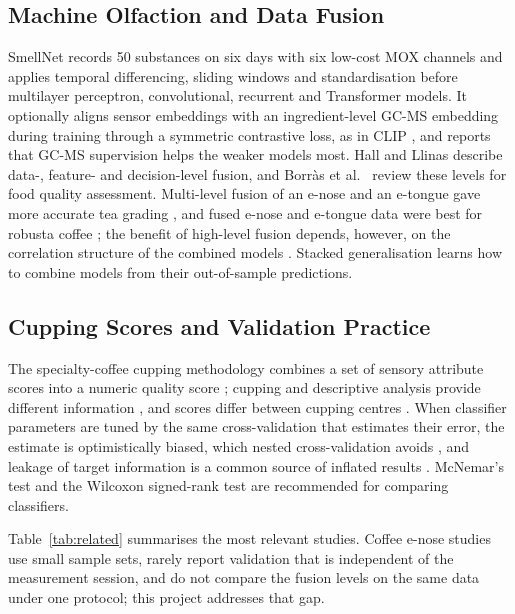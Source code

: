 \documentclass[12pt]{article}
\begin{document}
\subsection{Machine Olfaction and Data Fusion}

SmellNet \cite{feng2026smellnet} records 50 substances on six days with six low-cost MOX channels and applies temporal differencing, sliding windows and standardisation before multilayer perceptron, convolutional, recurrent and Transformer models. It optionally aligns sensor embeddings with an ingredient-level GC-MS embedding during training through a symmetric contrastive loss, as in CLIP \cite{radford2021learning}, and reports that GC-MS supervision helps the weaker models most. Hall and Llinas \cite{hall1997introduction} describe data-, feature- and decision-level fusion, and Borr\`{a}s et al.\ \cite{borras2015data} review these levels for food quality assessment. Multi-level fusion of an e-nose and an e-tongue gave more accurate tea grading \cite{zhi2017framework}, and fused e-nose and e-tongue data were best for robusta coffee \cite{dong2017differentiation}; the benefit of high-level fusion depends, however, on the correlation structure of the combined models \cite{doeswijk2011increase}. Stacked generalisation \cite{wolpert1992stacked} learns how to combine models from their out-of-sample predictions.

\subsection{Cupping Scores and Validation Practice}

The specialty-coffee cupping methodology combines a set of sensory attribute scores into a numeric quality score \cite{revi2019coffee}; cupping and descriptive analysis provide different information \cite{didonfrancesco2014comparison}, and scores differ between cupping centres \cite{worku2016reproducibility}. When classifier parameters are tuned by the same cross-validation that estimates their error, the estimate is optimistically biased, which nested cross-validation avoids \cite{varma2006bias,cawley2010overfitting}, and leakage of target information is a common source of inflated results \cite{kaufman2012leakage}. McNemar's test \cite{dietterich1998approximate} and the Wilcoxon signed-rank test \cite{demsar2006statistical} are recommended for comparing classifiers.

Table~\ref{tab:related} summarises the most relevant studies. Coffee e-nose studies use small sample sets, rarely report validation that is independent of the measurement session, and do not compare the fusion levels on the same data under one protocol; this project addresses that gap.
\end{document}
